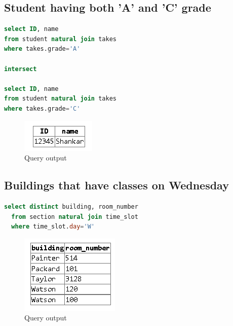 \documentclass{article}
\begin{document}
\subsection{Student having both 'A' and 'C' grade}
\begin{lstlisting}[language=sql]
select ID, name 
from student natural join takes 
where takes.grade='A'

intersect

select ID, name 
from student natural join takes 
where takes.grade='C'
\end{lstlisting}
\begin{figure}[!ht]
  \begin{center}
  \includegraphics[scale=1]{4_b.png}
  \caption{Query output}
  \end{center}
\end{figure}
\newpage
\subsection{Buildings that have classes on Wednesday}
\begin{lstlisting}[language=sql]
  select distinct building, room_number
  from section natural join time_slot
  where time_slot.day='W'
\end{lstlisting}
\begin{figure}[!ht]
  \begin{center}
  \includegraphics[scale=1]{4_c.png}
  \caption{Query output}
  \end{center}
\end{figure}
\end{document}
